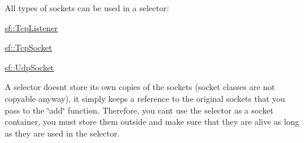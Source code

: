 All types of sockets can be used in a selector\+: \begin{DoxyItemize}
\item \hyperlink{classsf_1_1TcpListener}{sf\+::\+Tcp\+Listener} \item \hyperlink{classsf_1_1TcpSocket}{sf\+::\+Tcp\+Socket} \item \hyperlink{classsf_1_1UdpSocket}{sf\+::\+Udp\+Socket}\end{DoxyItemize}
A selector doesn\textquotesingle{}t store its own copies of the sockets (socket classes are not copyable anyway), it simply keeps a reference to the original sockets that you pass to the \char`\"{}add\char`\"{} function. Therefore, you can\textquotesingle{}t use the selector as a socket container, you must store them outside and make sure that they are alive as long as they are used in the selector.


